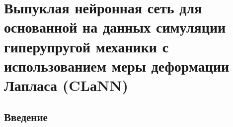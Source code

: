 \chapter{Выпуклая нейронная сеть для основанной на данных симуляции гиперупругой механики с использованием меры деформации Лапласа (CLаNN)}

\section{Введение}



